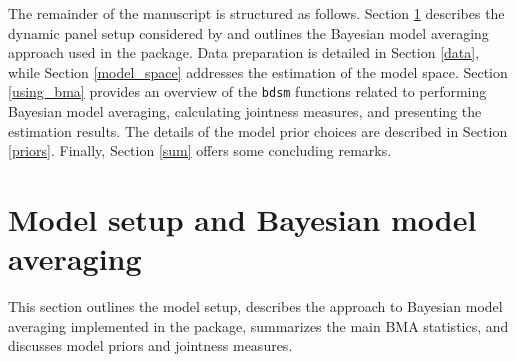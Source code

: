 \documentclass[a4paper]{article}
\begin{document}
The remainder of the manuscript is structured as follows. Section \ref{ms_bma} describes the dynamic panel setup considered by \citet{Moral+2013} and outlines the Bayesian model averaging approach used in the package. Data preparation is detailed in Section \ref{data}, while Section \ref{model_space} addresses the estimation of the model space. Section \ref{using_bma} provides an overview of the \verb+bdsm+ functions related to performing Bayesian model averaging, calculating jointness measures, and presenting the estimation results. The details of the model prior choices are described in Section \ref{priors}. Finally, Section \ref{sum} offers some concluding remarks.



\section{Model setup and Bayesian model averaging}\label{ms_bma}
This section outlines the model setup, describes the approach to Bayesian model averaging implemented in the package, summarizes the main BMA statistics, and discusses model priors and jointness measures.
\end{document}
